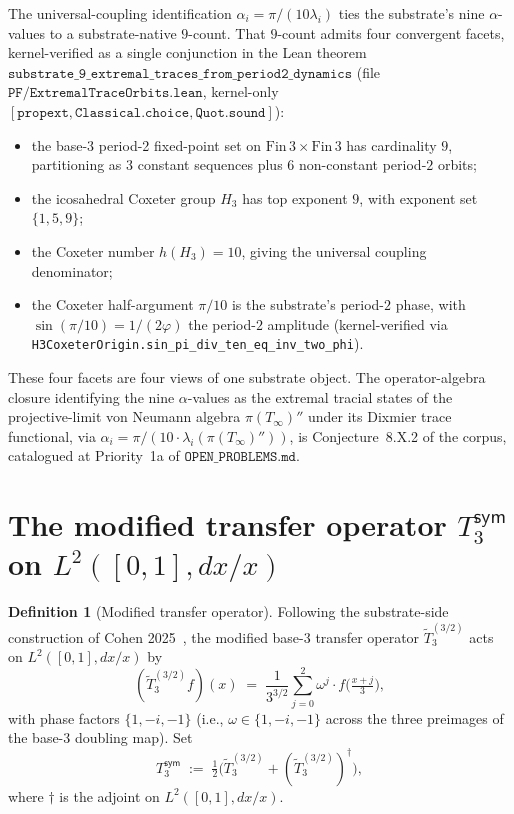 \documentclass[11pt,a4paper]{amsart}
\theoremstyle{plain}
\theoremstyle{definition}
\newtheorem{definition}[theorem]{Definition}
\newcommand{\Tinf}{T_{\infty}}
\newcommand{\Tsym}{T_3^{\textsf{sym}}}
\begin{document}
The universal-coupling identification $\alpha_{i} = \pi/(10\lambda_{i})$ ties the substrate's nine $\alpha$-values to a substrate-native $9$-count. That $9$-count admits four convergent facets, kernel-verified as a single conjunction in the Lean theorem $\texttt{substrate\_9\_extremal\_traces\_from\_period2\_dynamics}$ (file $\texttt{PF/ExtremalTraceOrbits.lean}$, kernel-only $[\texttt{propext}, \texttt{Classical.choice}, \texttt{Quot.sound}]$):
\begin{itemize}[itemsep=1pt,leftmargin=1.5em]
\item[(F1)] the base-3 period-2 fixed-point set on $\mathrm{Fin}\,3 \times \mathrm{Fin}\,3$ has cardinality $9$, partitioning as $3$ constant sequences plus $6$ non-constant period-$2$ orbits;
\item[(F2)] the icosahedral Coxeter group $H_{3}$ has top exponent $9$, with exponent set $\{1, 5, 9\}$;
\item[(F3)] the Coxeter number $h(H_{3}) = 10$, giving the universal coupling denominator;
\item[(F4)] the Coxeter half-argument $\pi/10$ is the substrate's period-$2$ phase, with $\sin(\pi/10) = 1/(2\varphi)$ the period-$2$ amplitude (kernel-verified via \texttt{H3CoxeterOrigin.sin\_pi\_div\_ten\_eq\_inv\_two\_phi}).
\end{itemize}
These four facets are four views of one substrate object. The operator-algebra closure identifying the nine $\alpha$-values as the extremal tracial states of the projective-limit von Neumann algebra $\pi(\Tinf)''$ under its Dixmier trace functional, via $\alpha_{i} = \pi/(10 \cdot \lambda_{i}(\pi(\Tinf)''))$, is Conjecture~8.X.2 of the corpus, catalogued at Priority~1a of $\texttt{OPEN\_PROBLEMS.md}$.

\section{The modified transfer operator $\Tsym$ on $L^{2}([0,1], dx/x)$}\label{sec:t3sym}

\begin{definition}[Modified transfer operator]\label{def:t3sym}
Following the substrate-side construction of Cohen 2025~\cite{cohen2025transferOp}, the modified base-3 transfer operator $\widetilde{T}_{3}^{(3/2)}$ acts on $L^{2}([0,1], dx/x)$ by
\[
(\widetilde{T}_{3}^{(3/2)} f)(x) \;=\; \frac{1}{3^{3/2}} \sum_{j = 0}^{2} \omega^{j} \cdot f\bigl( \tfrac{x + j}{3} \bigr),
\]
with phase factors $\{1, -i, -1\}$ (i.e., $\omega \in \{1, -i, -1\}$ across the three preimages of the base-3 doubling map). Set
\[
\Tsym \;:=\; \tfrac{1}{2}\bigl(\widetilde{T}_{3}^{(3/2)} + (\widetilde{T}_{3}^{(3/2)})^{\dagger}\bigr),
\]
where $\dagger$ is the adjoint on $L^{2}([0,1], dx/x)$.
\end{definition}
\end{document}
